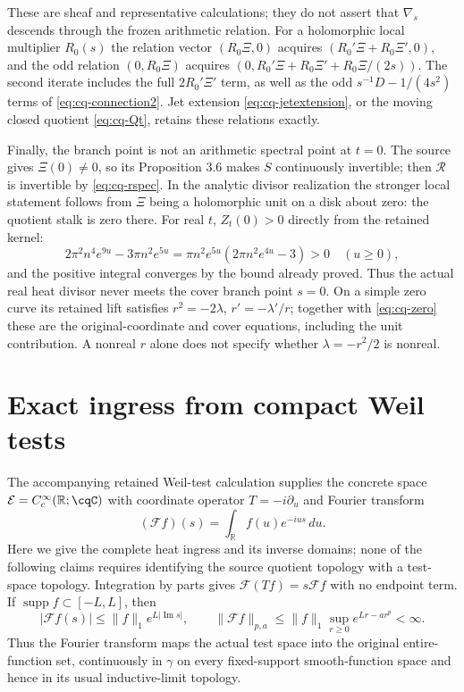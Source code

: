These are sheaf and representative calculations; they do not assert
that $\nabla_s$ descends through the frozen arithmetic relation.
For a holomorphic local multiplier $R_0(s)$ the relation vector
$(R_0\Xi,0)$ acquires $(R_0'\Xi+R_0\Xi',0)$, and the odd
relation $(0,R_0\Xi)$ acquires
$(0,R_0'\Xi+R_0\Xi'+R_0\Xi/(2s))$.
The second iterate includes the full $2R_0'\Xi'$ term, as well as
the odd $s^{-1}D-1/(4s^2)$ terms of
\eqref{eq:cq-connection2}. Jet extension
\eqref{eq:cq-jetextension}, or the moving closed quotient
\eqref{eq:cq-Qt}, retains these relations exactly.

Finally, the branch point is not an arithmetic spectral point at
$t=0$. The source gives $\Xi(0)\ne0$, so its Proposition 3.6
makes $S$ continuously invertible; then $\mathcal R$ is invertible
by \eqref{eq:cq-rspec}. In the analytic divisor realization the
stronger local statement follows from $\Xi$ being a holomorphic
unit on a disk about zero: the quotient stalk is zero there.
For real $t$, $Z_t(0)>0$ directly from the retained kernel:
\[
 2\pi^2n^4e^{9u}-3\pi n^2e^{5u}
 =\pi n^2e^{5u}(2\pi n^2e^{4u}-3)>0\quad(u\geq0),
\]
and the positive integral converges by the bound already proved.
Thus the actual real heat divisor never meets the cover branch
point $s=0$. On a simple zero curve its retained lift satisfies
$r^2=-2\lambda$, $r'=-\lambda'/r$; together with
\eqref{eq:cq-zero} these are the original-coordinate and cover
equations, including the unit contribution. A nonreal $r$ alone
does not specify whether $\lambda=-r^2/2$ is nonreal.

\section{Exact ingress from compact Weil tests}
\label{sec:cq-tests}
The accompanying retained Weil-test calculation supplies the concrete
space $\mathcal E=C_c^\infty(\mathbb R;\cqC)$ with coordinate
operator $T=-i\partial_u$ and Fourier transform
\[
 (\mathscr Ff)(s)=\int_{\mathbb R}f(u)e^{-ius}\,du.
\]
Here we give the complete heat ingress and its inverse domains;
none of the following claims requires identifying the source
quotient topology with a test-space topology. Integration by parts
gives $\mathscr F(Tf)=s\mathscr Ff$ with no endpoint term.
If $\operatorname{supp}f\subset[-L,L]$, then
\[
 |\mathscr Ff(s)|\leq\|f\|_1e^{L|\operatorname{Im}s|},
 \qquad
 \|\mathscr Ff\|_{p,a}\leq
 \|f\|_1\sup_{r\geq0}e^{Lr-ar^p}<\infty.
\]
Thus the Fourier transform maps the actual test space into the
original entire-function set, continuously in $\gamma$ on every
fixed-support smooth-function space and hence in its usual
inductive-limit topology.

